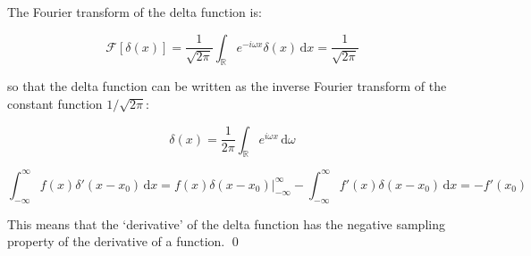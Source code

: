 \documentclass[12pt]{article}
\begin{document}
The Fourier transform of the delta function is:

\begin{equation}
    \mathcal{F}[\delta(x)] = \frac{1}{\sqrt{2\pi}} \int_{\mathbb{R}} e^{-i\omega x} \delta(x) \, \mathrm{d}x = \frac{1}{\sqrt{2\pi}}
\end{equation}

so that the delta function can be written as the inverse Fourier transform of the constant function $1/\sqrt{2\pi}$:

\begin{equation}
    \delta(x) = \frac{1}{2\pi} \int_{\mathbb{R}} e^{i\omega x} \, \mathrm{d}\omega
\end{equation}


\begin{equation}
    \int_{-\infty}^{\infty} f(x) \delta'(x - x_{0}) \, \mathrm{d}x = \left. f(x) \delta(x - x_{0}) \right|_{-\infty}^{\infty} - \int_{-\infty}^{\infty} f'(x) \delta(x - x_{0}) \, \mathrm{d}x = -f'(x_{0})
\end{equation}

This means that the `derivative' of the delta function has the negative sampling property of the derivative of a function.
\qed
\end{document}

